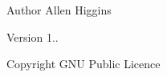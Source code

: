 \begin{DoxyAuthor}{Author}
Allen Higgins 
\end{DoxyAuthor}
\begin{DoxyVersion}{Version}
1.. 
\end{DoxyVersion}
\begin{DoxyCopyright}{Copyright}
G\+NU Public Licence
\end{DoxyCopyright}
